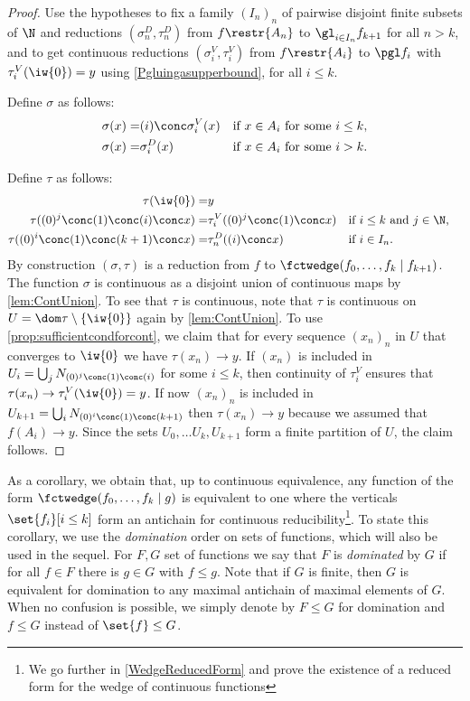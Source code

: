 \begin{proof}
Use the hypotheses to fix a family $(I_n)_n$ of pairwise disjoint finite subsets of $\N$ and reductions $(\sigma^D_n,\tau^D_n)$ from $f\restr{A_n}$ to $\gl_{i\in I_n} f_{k+1}$ for all $n>k$,
and to get continuous reductions $(\sigma^V_i,\tau^V_i)$ from $f\restr{A_i}$ to $\pgl f_i$ with $\tau^V_i(\iw{0})=y$ using \cref{Pgluingasupperbound}, for all $i\leq k$. 

Define $\sigma$ as follows: 
\begin{align*}
\sigma(x)=&(i)\conc\sigma^V_i(x) && \text{if $x\in A_i$ for some $i\leq k$,}\\
\sigma(x)=&\sigma^D_i(x) && \text{if $x\in A_i$ for some $i>k$.}
\end{align*}

Define $\tau$ as follows:
\begin{align*}
\tau(\iw{0})=&y\\
\tau((0)^j\conc(1)\conc(i)\conc x)=&\tau^V_i((0)^j\conc(1)\conc x)&&\text{if $i\leq k$ and $j\in \N$,}\\
\tau((0)^{i}\conc(1)\conc(k+1)\conc x)=&\tau^D_{n}((i)\conc x) && \text{if $i\in I_{n}$.}
\end{align*} 
By construction $(\sigma, \tau)$ is a reduction from $f$ to $\fctwedge (f_0,\ldots,f_{k}\mid f_{k+1})$. The function $\sigma$ is continuous as a disjoint union of continuous maps by \cref{lem:ContUnion}.
To see that $\tau$ is continuous, note that $\tau$ is continuous on $U=\dom \tau \setminus \{\iw{0}\}$ again by \cref{lem:ContUnion}.
To use \cref{prop:sufficientcondforcont}, we claim that for every sequence $(x_n)_n$ in $U$ that converges to $\iw{0}$ we have $\tau(x_n)\to y$.
If $(x_n)$ is included in $U_i=\bigcup_j N_{(0)^j\conc(1)\conc(i)}$ for some $i\leq k$, then continuity of $\tau_i^{V}$ ensures that $\tau(x_n)\to \tau^V_i(\iw{0})=y$.
If now $(x_n)_n$ is included in $U_{k+1}=\bigcup_{i} N_{(0)^i\conc(1)\conc(k+1)}$ then $\tau(x_n)\to y$ because we assumed that $f(A_i)\to y$.
Since the sets $U_0,\ldots U_{k},U_{k+1}$ form a finite partition of $U$, the claim follows.
\end{proof}

As a corollary, we obtain that, up to continuous equivalence, any function of the form $\fctwedge (f_0,\ldots,f_{k}\mid g)$ is equivalent to one where the verticals $\set{f_i}[i\leq k]$ form an antichain for continuous reducibility\footnote{We go further in \cref{WedgeReducedForm} and prove the existence of a reduced form for the wedge of continuous functions}. To state this corollary, we use the \emph{domination} order on sets of functions, which will also be used in the sequel. For $F,G$ set of functions we say that $F$ is \emph{dominated} by $G$  if for all $f\in F$ there is $g\in G$ with $f\leq g$. Note that if $G$ is finite, then $G$ is equivalent for domination to any maximal antichain of maximal elements of $G$.
When no confusion is possible, we simply denote by $F\leq G$ for domination and $f\leq G$ instead of $\set{f}\leq G$. 



